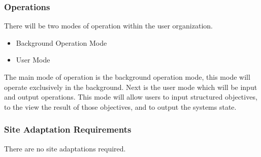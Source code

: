 \documentclass[draftclsnofoot, onecolumn, compsoc, 10pt]{IEEEtran}
\begin{document}
\subsubsection{Operations}
There will be two modes of operation within the user organization. 
\begin{itemize}
\item Background Operation Mode \\
\item User Mode \\ 
\end{itemize}
The main mode of operation is the background operation mode, this mode will operate exclusively in the background. Next is the user mode which will be input and output operations. This mode will allow users to input structured objectives, to the view the result of those objectives, and to output the systems state.

\subsubsection{Site Adaptation Requirements}
There are no site adaptations required.
\end{document}
